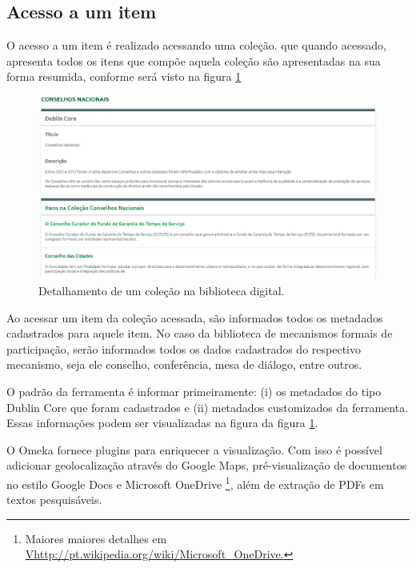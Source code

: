 \subsection*{Acesso a um item}

O acesso a um item é realizado acessando uma coleção. que quando acessado, apresenta todos os itens que compõe aquela coleção são apresentadas na sua forma resumida, conforme será visto na figura \ref{fig:descricao_prototipo}

\graphicspath{{figuras/prototipo/}}
\begin{figure}[H]
\centering
\includegraphics[width=1.0\textwidth]{descricao-colecao}
\caption{Detalhamento de um coleção na biblioteca digital.}
\label{fig:descricao_prototipo}
\end{figure}

Ao acessar um item da coleção acessada, são informados todos os metadados cadastrados para aquele item. No caso da biblioteca de mecanismos formais de participação, serão informados todos os dados cadastrados do respectivo mecanismo, seja ele conselho, conferência, mesa de diálogo, entre outros. 

O padrão da ferramenta é informar primeiramente: (i) os metadados do tipo Dublin Core que foram cadastrados e (ii) metadados customizados da ferramenta. Essas informações podem ser visualizadas na figura da figura \ref{fig:descricao_prototipo}.

O Omeka fornece plugins para enriquecer a visualização. Com isso é possível adicionar geolocalização através do Google Maps, pré-visualização de documentos no estilo Google Docs e Microsoft OneDrive \footnote{Maiores maiores detalhes em \url{Vhttp://pt.wikipedia.org/wiki/Microsoft\_OneDrive.}}, além de extração de PDFs em textos pesquisáveis.

